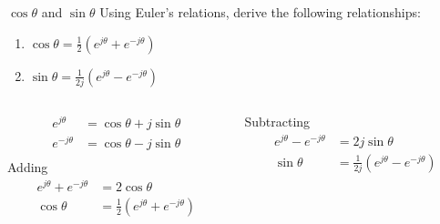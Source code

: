 \begin{frame}
\begin{columns}[T]
\begin{column}{0.7\textwidth}
\begin{overprint}
        \end{overprint}
        \end{column}
    \end{columns}
\end{frame}

\begin{frame}{$\cos\theta$ and $\sin\theta$}
    Using Euler's relations, derive the following relationships:
    \begin{enumerate}
        \item $\cos\theta = \frac{1}{2}(e^{j\theta} + e^{-j\theta})$
        \item $\sin\theta = \frac{1}{2j}(e^{j\theta} - e^{-j\theta})$
    \end{enumerate}
    \begin{columns}[t]
        \begin{column}{0.5\textwidth}
            \pause
            \begin{align*}
                e^{j\theta}&= \cos\theta +  j\sin\theta\\
                e^{-j\theta}&= \cos\theta -  j\sin\theta\\
            \end{align*}
            \pause
            Adding
            \begin{align*}
                e^{j\theta} + e^{-j\theta}&= 2\cos\theta \\
                \cos\theta &= \frac{1}{2}(e^{j\theta} + e^{-j\theta})\\
            \end{align*}
        \end{column}
        \begin{column}{0.5\textwidth}
            \pause
            Subtracting
            \begin{align*}
                e^{j\theta} - e^{-j\theta}&= 2j\sin\theta \\
                \sin\theta &= \frac{1}{2j}(e^{j\theta} - e^{-j\theta})\\
            \end{align*}
        \end{column}
    \end{columns}


\end{frame}


